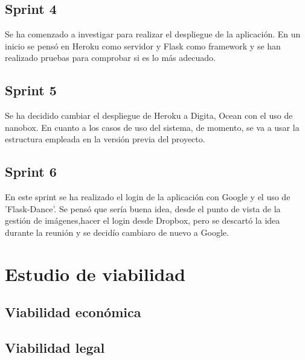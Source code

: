 \subsection{Sprint 4}
Se ha comenzado a investigar para realizar el despliegue de la aplicación. En un inicio se pensó en Heroku como servidor y Flask como framework y se han realizado pruebas para comprobar si es lo más adecuado. 
\subsection{Sprint 5}
Se ha decidido cambiar el despliegue de Heroku a Digita, Ocean con el uso de nanobox. En cuanto a los casos de uso del sistema, de momento, se va a usar la estructura empleada en la versión previa del proyecto.
\subsection{Sprint 6}
En este sprint se ha realizado el login de la aplicación con Google y el uso de 'Flask-Dance'. Se pensó que sería buena idea, desde el punto de vista de la gestión de imágenes,hacer el login desde Dropbox, pero se descartó la idea durante la reunión y se decidío cambiaro de nuevo a Google.
\section{Estudio de viabilidad}

\subsection{Viabilidad económica}

\subsection{Viabilidad legal}


